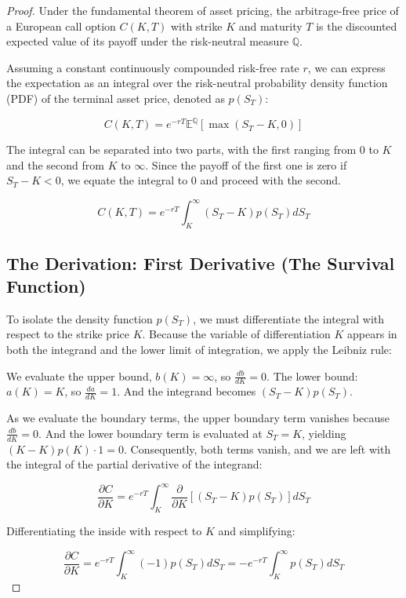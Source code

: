\documentclass[12pt,oneside]{report}
\theoremstyle{definition}
\theoremstyle{remark}
\begin{document}
\begin{proof}
Under the fundamental theorem of asset pricing, the arbitrage-free price of a European call option $C(K, T)$ with strike $K$ and maturity $T$ is the discounted expected value of its payoff under the risk-neutral measure $\mathbb{Q}$.

Assuming a constant continuously compounded risk-free rate $r$, we can express the expectation as an integral over the risk-neutral probability density function (PDF) of the terminal asset price, denoted as $p(S_T)$:

$$C(K, T) = e^{-rT} \mathbb{E}^{\mathbb{Q}}[\max(S_T - K, 0)]$$

The integral can be separated into two parts, with the first ranging from $0$ to $K$ and the second from $K$ to $\infty$. Since the payoff of the first one is zero if $S_T - K < 0$, we equate the integral to 0 and proceed with the second.

\begin{equation}
C(K, T) = e^{-rT} \int_{K}^{\infty} (S_T - K) p(S_T) dS_T
\label{eq:expected_payoff_call}
\end{equation}
\subsection{The Derivation: First Derivative (The Survival Function)}

To isolate the density function $p(S_T)$, we must differentiate the integral with respect to the strike price $K$. Because the variable of differentiation $K$ appears in both the integrand and the lower limit of integration, we apply the Leibniz rule:

We evaluate the upper bound, $b(K) = \infty$, so $\frac{db}{dK} = 0$. The lower bound: $a(K) = K$, so $\frac{da}{dK} = 1$.
And the integrand becomes $(S_T - K)p(S_T)$.

As we evaluate the boundary terms, the upper boundary term vanishes because $\frac{db}{dK} = 0$. And the lower boundary term is evaluated at $S_T = K$, yielding $(K - K)p(K) \cdot 1 = 0$. Consequently, both terms vanish, and we are left with the integral of the partial derivative of the integrand:

$$\frac{\partial C}{\partial K} = e^{-rT} \int_{K}^{\infty} \frac{\partial}{\partial K} \left[ (S_T - K) p(S_T) \right] dS_T$$

Differentiating the inside with respect to $K$ and simplifying:


\begin{equation}
\frac{\partial C}{\partial K} = e^{-rT} \int_{K}^{\infty} (-1) p(S_T) dS_T = -e^{-rT} \int_{K}^{\infty} p(S_T) dS_T
\label{eq:disc_survival_function}
\end{equation}


\end{proof}
\end{document}
